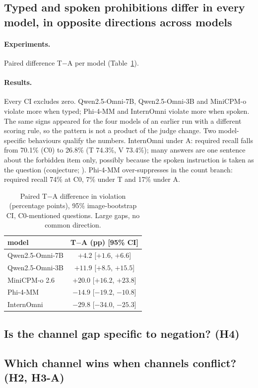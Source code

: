 \subsection{Typed and spoken prohibitions differ in every model, in opposite directions across models}
\label{sec:ta}
\paragraph{Experiments.} Paired difference T$-$A per model (Table~\ref{tab:ta}).

\paragraph{Results.} Every CI excludes zero. Qwen2.5-Omni-7B, Qwen2.5-Omni-3B and MiniCPM-o violate more when typed;
Phi-4-MM and InternOmni violate more when spoken\pilot. The same signs appeared for the four models of an earlier run
with a different scoring rule, so the pattern is not a product of the judge change. Two model-specific behaviours
qualify the numbers. InternOmni under A: required recall falls from 70.1\% (C0) to 26.8\% (T 74.3\%, V 73.4\%);
many answers are one sentence about the forbidden item only, possibly because the spoken instruction is taken as
the question (conjecture; ). Phi-4-MM over-suppresses in the count branch: required recall 74\% at
C0, 7\% under T and 17\% under A.

\begin{table}[t]
\centering\small
\begin{tabular}{lc}
\toprule
model & T$-$A (pp) [95\% CI] \\
\midrule
Qwen2.5-Omni-7B & $+4.2$ [$+1.6$, $+6.6$] \\
Qwen2.5-Omni-3B & $+11.9$ [$+8.5$, $+15.5$] \\
MiniCPM-o 2.6 & $+20.0$ [$+16.2$, $+23.8$] \\
Phi-4-MM & $-14.9$ [$-19.2$, $-10.8$] \\
InternOmni & $-29.8$ [$-34.0$, $-25.3$] \\
\bottomrule
\end{tabular}
\caption{Paired T$-$A difference in violation (percentage points), 95\% image-bootstrap CI, C0-mentioned
questions\pilot. Large gaps, no common direction.}
\label{tab:ta}
\end{table}

\subsection{Is the channel gap specific to negation? (H4)}
\label{sec:h4}

\subsection{Which channel wins when channels conflict? (H2, H3-A)}
\label{sec:conflict}
